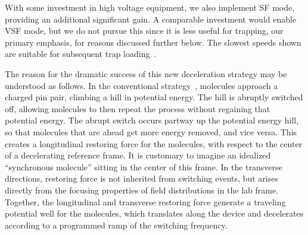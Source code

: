 \documentclass[%
 reprint,
 amsmath,amssymb,
 aps,
prl,
]{revtex4-1}
\begin{document}
With some investment in high voltage equipment, we also implement SF mode, providing an additional significant gain. %
A comparable investment would enable VSF mode, but we do not pursue this since it is less useful for trapping, our primary emphasis, for reasons discussed further below.
The slowest speeds shown are suitable for subsequent trap loading~\cite{}.



The reason for the dramatic success of this new deceleration strategy may be understood as follows.
In the conventional strategy~\cite{VanDeMeerakker2012}, molecules approach a charged pin pair, climbing a hill in potential energy. 
The hill is abruptly switched off, allowing molecules to then repeat the process without regaining that potential energy.
The abrupt switch occurs partway up the potential energy hill, so that molecules that are ahead get more energy removed, and vice versa. 
This creates a longitudinal restoring force for the molecules, with respect to the center of a decelerating reference frame.
It is customary to imagine an idealized ``synchronous molecule'' sitting in the center of this frame.
In the transverse directions, restoring force is not inherited from switching events, but arises directly from the focusing properties of field distributions in the lab frame.
Together, the longitudinal and transverse restoring force generate a traveling potential well for the molecules, which translates along the device and decelerates according to a programmed ramp of the switching frequency.
\end{document}

